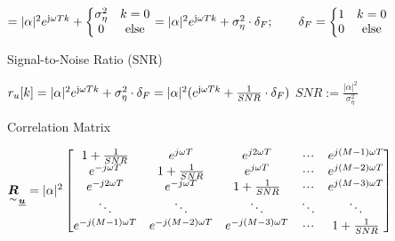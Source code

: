 \quad $=|\alpha|^2 e^{\mathrm{j} \omega T k}+\left\lbrace\begin{matrix} \sigma_\eta^2 & k=0\\0&\textrm{else}\end{matrix} \right. =|\alpha|^2 e^{\mathrm{j} \omega T k}+\sigma_\eta^2\cdot \delta_F; \qquad \delta_F=\left\lbrace\begin{matrix} 1 & k=0\\0&\textrm{else}\end{matrix} \right.$

Signal-to-Noise Ratio (SNR)

\quad $r_u[k]=|\alpha|^2 e^{\mathrm{j} \omega T k}+\sigma_\eta^2\cdot \delta_F =|\alpha|^2 ( e^{\mathrm{j} \omega T k}+\frac{1}{SNR}\cdot \delta_F)$ \with $SNR:=\frac{|\alpha|^2}{\sigma_\eta^2}$

Correlation Matrix 

\quad $\ma{R}_{\vec{u}}=|\alpha|^2 
		\mat{	1+\frac{1}{SNR}& e^{j\omega T}& e^{j2\omega T}& \shdots&e^{j(M-1)\omega T}\\
				e^{-j\omega T}& 1+\frac{1}{SNR}& e^{j\omega T}& \shdots&e^{j(M-2)\omega T}\\
				e^{-j2\omega T}&e^{-j\omega T}& 1+\frac{1}{SNR}& \shdots&e^{j(M-3)\omega T}\\
				\ddots&\ddots&\ddots&\ddots&\ddots\\
				e^{-j(M-1)\omega T}& e^{-j(M-2)\omega T}& e^{-j(M-3)\omega T}& \shdots&1+\frac{1}{SNR}}$












